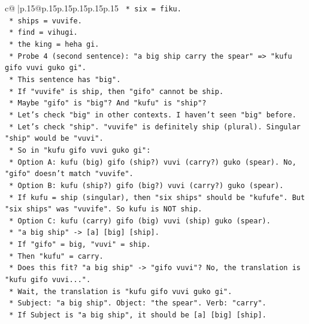 \documentclass{article}
\begin{document}
{\begin{supertabular}{c@{$\;$}|p{.15\linewidth}@{}p{.15\linewidth}p{.15\linewidth}p{.15\linewidth}p{.15\linewidth}p{.15\linewidth}}
{{{\texttt{            *   six = fiku.} \\
\texttt{            *   ships = vuvife.} \\
\texttt{            *   find = vihugi.} \\
\texttt{            *   the king = heha gi.} \\
\texttt{        *   Probe 4 (second sentence): "a big ship carry the spear" => "kufu gifo vuvi guko gi".} \\
\texttt{            *   This sentence has "big".} \\
\texttt{            *   If "vuvife" is ship, then "gifo" cannot be ship.} \\
\texttt{            *   Maybe "gifo" is "big"? And "kufu" is "ship"?} \\
\texttt{            *   Let's check "big" in other contexts. I haven't seen "big" before.} \\
\texttt{            *   Let's check "ship". "vuvife" is definitely ship (plural). Singular "ship" would be "vuvi".} \\
\texttt{            *   So in "kufu gifo vuvi guko gi":} \\
\texttt{                *   Option A: kufu (big) gifo (ship?) vuvi (carry?) guko (spear). No, "gifo" doesn't match "vuvife".} \\
\texttt{                *   Option B: kufu (ship?) gifo (big?) vuvi (carry?) guko (spear).} \\
\texttt{                    *   If kufu = ship (singular), then "six ships" should be "kufufe". But "six ships" was "vuvife". So kufu is NOT ship.} \\
\texttt{                *   Option C: kufu (carry) gifo (big) vuvi (ship) guko (spear).} \\
\texttt{                    *   "a big ship" {-}> {[}a{]} {[}big{]} {[}ship{]}.} \\
\texttt{                    *   If "gifo" = big, "vuvi" = ship.} \\
\texttt{                    *   Then "kufu" = carry.} \\
\texttt{                    *   Does this fit? "a big ship" {-}> "gifo vuvi"? No, the translation is "kufu gifo vuvi...".} \\
\texttt{                    *   Wait, the translation is "kufu gifo vuvi guko gi".} \\
\texttt{                    *   Subject: "a big ship". Object: "the spear". Verb: "carry".} \\
\texttt{                    *   If Subject is "a big ship", it should be {[}a{]} {[}big{]} {[}ship{]}.} \\
}}}
\end{supertabular}}
\end{document}

